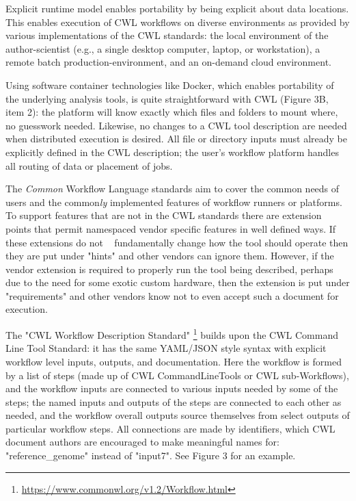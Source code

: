 \documentclass[sigconf,authordraft]{acmart}
\begin{document}
Explicit runtime model enables portability by being explicit about
data locations. This enables execution of CWL workflows on diverse
environments as provided by various implementations of the CWL
standards: the local environment of the author-scientist (e.g., a single
desktop computer, laptop, or workstation), a remote batch
production-environment, and an on-demand cloud environment.

Using software container technologies like Docker, which enables
portability of the underlying analysis tools, is quite straightforward
with CWL (Figure 3B, item 2): the platform will know exactly which files
and folders to mount where, no guesswork needed. Likewise, no
changes to a CWL tool description are needed when distributed execution
is desired. All file or directory inputs must already be explicitly
defined in the CWL description; the user's workflow platform handles all
routing of data or placement of jobs.

The \textit{Common} Workflow Language standards aim to cover the common
needs of users and the common\textit{ly} implemented features of
workflow runners or platforms. To support features that are not in the
CWL standards there are extension points that permit namespaced vendor
specific features in well defined ways. If these extensions do not ~
fundamentally change how the tool should operate then they are put under
"hints" and other vendors can ignore them. However, if the vendor
extension is required to properly run the tool being described, perhaps
due to the need for some exotic custom hardware, then the extension is
put under "requirements" and other vendors know not to even accept
such a document for execution.

The "CWL Workflow Description Standard" \footnote{\url{https://www.commonwl.org/v1.2/Workflow.html}}
builds upon the CWL Command Line Tool Standard: it has the same YAML/JSON style
syntax with explicit workflow level inputs, outputs, and documentation.
Here the workflow is formed by a list of steps (made up of CWL
CommandLineTools or CWL sub-Workflows), and the workflow inputs are
connected to various inputs needed by some of the steps; the named
inputs and outputs of the steps are connected to each other as needed,
and the workflow overall outputs source themselves from select outputs
of particular workflow steps. All connections are made by identifiers,
which CWL document authors are encouraged to make meaningful names for:
"reference\_genome" instead of "input7". See Figure 3 for an
example.
\end{document}
